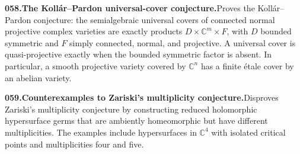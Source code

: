 \documentclass[11pt,a4paper]{article}
\begin{document}
  \par \begin{minipage}{\linewidth}
  \fontsize{10.5}{12.6}\selectfont\RaggedRight
  \hypertarget{result 058}{}
  {\bfseries\textcolor{muted}{058.}\enspace The Koll\'ar--Pardon universal-cover conjecture.}\enspace Proves the Koll\'ar--Pardon conjecture: the semialgebraic universal covers of connected normal projective complex varieties are exactly products $D\times\mathbb C^m\times F$, with $D$ bounded symmetric and $F$ simply connected, normal, and projective. A universal cover is quasi-projective exactly when the bounded symmetric factor is absent. In particular, a smooth projective variety covered by $\mathbb C^n$ has a finite \textnormal{étale} cover by an abelian variety.\par
  \end{minipage}\par\vspace{5pt}



  \par \begin{minipage}{\linewidth}
  \fontsize{10.5}{12.6}\selectfont\RaggedRight
  \hypertarget{result 059}{}
  {\bfseries\textcolor{muted}{059.}\enspace Counterexamples to Zariski's multiplicity conjecture.}\enspace Disproves Zariski's multiplicity conjecture by constructing reduced holomorphic hypersurface germs that are ambiently homeomorphic but have different multiplicities. The examples include hypersurfaces in $\mathbb C^4$ with isolated critical points and multiplicities four and five.\par
  \end{minipage}\par\vspace{5pt}
\end{document}
